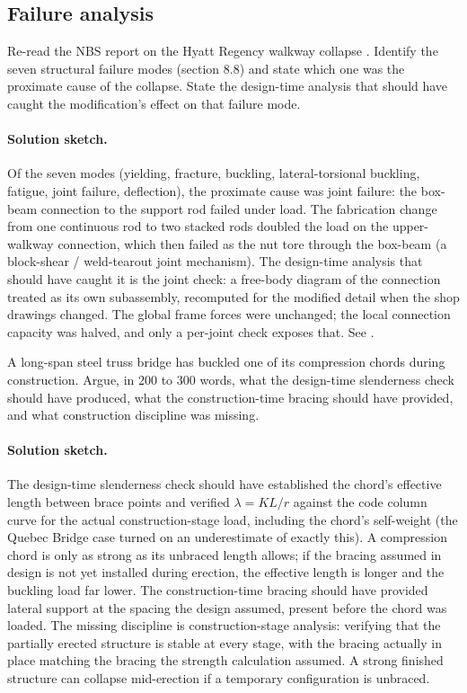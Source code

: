 \subsection*{Failure analysis}

\begin{exercise}
Re-read the NBS report on the Hyatt Regency walkway collapse \cite{
acc:nbs-hyatt-1982}. Identify the seven structural failure modes
(section 8.8) and state which one was the proximate cause of the
collapse. State the design-time analysis that should have caught
the modification's effect on that failure mode.

\paragraph{Solution sketch.} Of the seven modes (yielding, fracture,
buckling, lateral-torsional buckling, fatigue, joint failure,
deflection), the proximate cause was joint failure: the box-beam
connection to the support rod failed under load. The fabrication change
from one continuous rod to two stacked rods doubled the load on the
upper-walkway connection, which then failed as the nut tore through the
box-beam (a block-shear / weld-tearout joint mechanism). The
design-time analysis that should have caught it is the joint check: a
free-body diagram of the connection treated as its own subassembly,
recomputed for the modified detail when the shop drawings changed. The
global frame forces were unchanged; the local connection capacity was
halved, and only a per-joint check exposes that. See
\cite{acc:nbs-hyatt-1982}.
\end{exercise}

\begin{exercise}
A long-span steel truss bridge has buckled one of its compression
chords during construction. Argue, in $200$ to $300$ words, what
the design-time slenderness check should have produced, what the
construction-time bracing should have provided, and what
construction discipline was missing.

\paragraph{Solution sketch.} The design-time slenderness check should
have established the chord's effective length between brace points and
verified $\lambda = KL/r$ against the code column curve for the actual
construction-stage load, including the chord's self-weight (the Quebec
Bridge case turned on an underestimate of exactly this). A compression
chord is only as strong as its unbraced length allows; if the bracing
assumed in design is not yet installed during erection, the effective
length is longer and the buckling load far lower. The construction-time
bracing should have provided lateral support at the spacing the design
assumed, present before the chord was loaded. The missing discipline is
construction-stage analysis: verifying that the partially erected
structure is stable at every stage, with the bracing actually in place
matching the bracing the strength calculation assumed. A strong
finished structure can collapse mid-erection if a temporary
configuration is unbraced.
\end{exercise}

